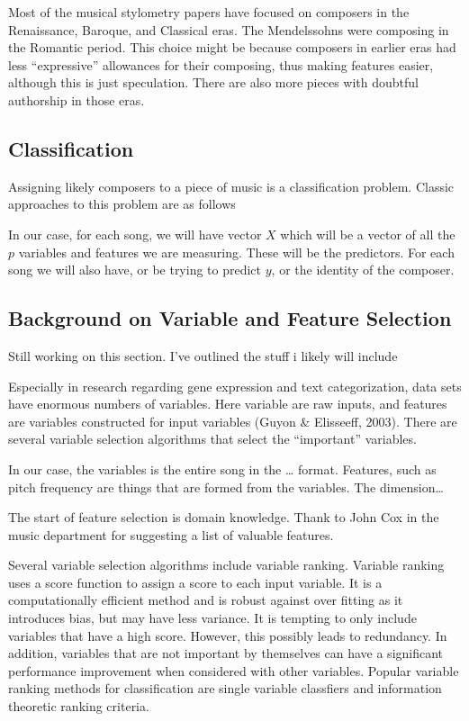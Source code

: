 \documentclass[12pt,twoside]{reedthesis}
\theoremstyle{definition}
\theoremstyle{definition}
\theoremstyle{definition}
\theoremstyle{remark}
\begin{document}
Most of the musical stylometry papers have focused on composers in the
Renaissance, Baroque, and Classical eras. The Mendelssohns were
composing in the Romantic period. This choice might be because composers
in earlier eras had less ``expressive'' allowances for their composing,
thus making features easier, although this is just speculation. There
are also more pieces with doubtful authorship in those eras.

\subsection{Classification}\label{classification}

Assigning likely composers to a piece of music is a classification
problem. Classic approaches to this problem are as follows

In our case, for each song, we will have vector \(X\) which will be a
vector of all the \(p\) variables and features we are measuring. These
will be the predictors. For each song we will also have, or be trying to
predict \(y\), or the identity of the composer.

\subsection{Background on Variable and Feature
Selection}\label{background-on-variable-and-feature-selection}

Still working on this section. I've outlined the stuff i likely will
include

Especially in research regarding gene expression and text
categorization, data sets have enormous numbers of variables. Here
variable are raw inputs, and features are variables constructed for
input variables (Guyon \& Elisseeff, 2003). There are several variable
selection algorithms that select the ``important'' variables.

In our case, the variables is the entire song in the \ldots{} format.
Features, such as pitch frequency are things that are formed from the
variables. The dimension\ldots{}

The start of feature selection is domain knowledge. Thank to John Cox in
the music department for suggesting a list of valuable features.

Several variable selection algorithms include variable ranking. Variable
ranking uses a score function to assign a score to each input variable.
It is a computationally efficient method and is robust against over
fitting as it introduces bias, but may have less variance. It is
tempting to only include variables that have a high score. However, this
possibly leads to redundancy. In addition, variables that are not
important by themselves can have a significant performance improvement
when considered with other variables. Popular variable ranking methods
for classification are single variable classfiers and information
theoretic ranking criteria.
\end{document}
